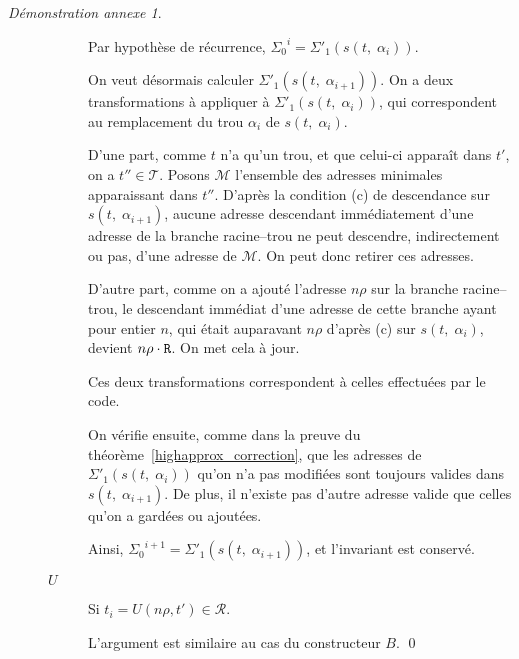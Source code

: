 \documentclass[11pt,a4paper]{article}
\theoremstyle{plain}
\theoremstyle{definition}
\theoremstyle{remark}
\newtheorem{demonstrationappendix}{Démonstration annexe}
\newcommand*{\Right}{\textnormal{\texttt{R}}}
\newcommand*{\trees}{\ensuremath{\mathcal{T}}}
\newcommand*{\representations}{\ensuremath{\mathcal{R}}}
\newcommand*{\lowapprox}{\ensuremath{\Sigma_0}}
\newcommand*{\highapproxspec}{\ensuremath{\Sigma'_1}}
\newcommand*{\treesimplify}{\ensuremath{s}}
\newcommand*{\cdespartial}{(c)}
\begin{document}
\begin{demonstrationappendix}
\begin{description}
\begin{description}
            Par hypothèse de récurrence, $\lowapprox^{i} = \highapproxspec \left( \treesimplify( t, \; {\alpha}_i ) \right)$. 
            
            On veut désormais calculer $\highapproxspec \left( \treesimplify( t, \; {\alpha}_{i+1} ) \right)$. On a deux transformations à appliquer à $\highapproxspec \left( \treesimplify( t, \; {\alpha}_{i} ) \right)$, qui correspondent au remplacement du trou $\alpha_{i}$ de $\treesimplify( t, \; {\alpha}_i )$.
            
            D'une part, comme $t$ n'a qu'un trou, et que celui-ci apparaît dans $t'$, on a $t'' \in \trees$. Posons $\mathcal{M}$ l'ensemble des adresses minimales apparaissant dans $t''$. D'après la condition \cdespartial{} de descendance sur $\treesimplify( t, \; {\alpha}_{i+1} )$, aucune adresse descendant immédiatement d'une adresse de la branche racine--trou ne peut descendre, indirectement ou pas, d'une adresse de $\mathcal{M}$. On peut donc retirer ces adresses.

            D'autre part, comme on a ajouté l'adresse $n\rho$ sur la branche racine--trou, le descendant immédiat d'une adresse de cette branche ayant pour entier $n$, qui était auparavant $n\rho$ d'après \cdespartial{} sur $\treesimplify( t, \; {\alpha}_{i} )$, devient $n\rho \cdot \Right$. On met cela à jour.

            Ces deux transformations correspondent à celles effectuées par le code.

            On vérifie ensuite, comme dans la preuve du théorème~\ref{highapprox_correction}, que les adresses de $\highapproxspec \left( \treesimplify( t, \; {\alpha}_{i} ) \right)$ qu'on n'a pas modifiées sont toujours valides dans $\treesimplify( t, \; {\alpha}_{i+1} )$. De plus, il n'existe pas d'autre adresse valide que celles qu'on a gardées ou ajoutées.

            Ainsi, $\lowapprox^{i+1} = \highapproxspec \left( \treesimplify( t, \; {\alpha}_{i+1} ) \right)$, et l'invariant est conservé.

            \item[$U$] Si $t_i = U(n\rho, t') \in \representations$.

            L'argument est similaire au cas du constructeur $B$.
\qed
        \end{description}
    \end{description}
\end{demonstrationappendix}
\end{document}
